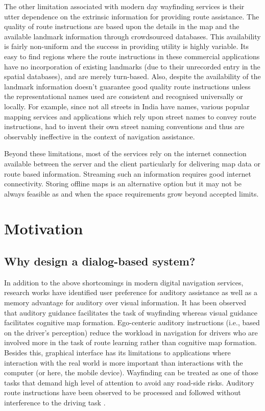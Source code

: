 \documentclass{iitkthesis}
\begin{document}
The other limitation associated with modern day wayfinding services is their utter dependence on the extrinsic information for providing route assistance. The quality of route instructions are based upon the details in the map and the available landmark information through crowdsourced databases. This availability is fairly non-uniform and the success in providing utility is highly variable. Its easy to find regions where the route instructions in these commercial applications have no incorporation of existing landmarks (due to their unrecorded entry in the spatial databases), and are merely turn-based. Also, despite the availability of the landmark information doesn't guarantee good quality route instructions unless the representational names used are consistent and recognised universally or locally. For example, since not all streets in India have names, various popular mapping services and applications which rely upon street names to convey route instructions, had to invent their own street naming conventions and thus are observably ineffective in the context of navigation assistance.

Beyond these limitations, most of the services rely on the internet connection available between the server and the client particularly for delivering map data or route based information. Streaming such an information requires good internet connectivity. Storing offline maps is an alternative option but it may not be always feasible as and when the space requirements grow beyond accepted limits.   

\section{Motivation}
\subsection{Why design a dialog-based system?}
In addition to the above shortcomings in modern digital navigation services, research works \cite{jensen2010,dalton,reagan2006} have identified user preference for auditory assistance as well as a memory advantage for auditory over visual information. It has been observed \cite{baldwin2009,furukawa2004} that auditory guidance facilitates the task of wayfinding whereas visual guidance facilitates cognitive map formation. Ego-centeric auditory instructions (i.e., based on the driver's perception) reduce the workload in navigation for drivers who are involved more in the task of route learning rather than cognitive map formation. Besides this, graphical interface has its limitations to applications where interaction with the real world is more important than interactions with the computer (or here, the mobile device). Wayfinding can be treated as one of those tasks that demand high level of attention to avoid any road-side risks. Auditory route instructions have been observed to be processed and followed without interference to the driving task \cite{jensen2010,dalton}.
\end{document}
